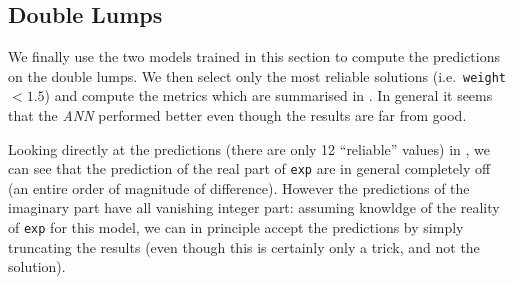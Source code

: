 \subsection{Double Lumps}

We finally use the two models trained in this section to compute the predictions on the double lumps.
We then select only the most reliable solutions (i.e.\ \texttt{weight} $< 1.5$) and compute the metrics which are summarised in .
In general it seems that the \emph{ANN} performed better even though the results are far from good.

\begin{table}[htbp]
  \centering
  \caption{Metrics computed on the double lumps.}
  \label{tab:agg:dlumps}
\end{table}

Looking directly at the predictions (there are only 12 ``reliable'' values) in , we can see that the prediction of the real part of \texttt{exp} are in general completely off (an entire order of magnitude of difference).
However the predictions of the imaginary part have all vanishing integer part: assuming knowldge of the reality of \texttt{exp} for this model, we can in principle accept the predictions by simply truncating the results (even though this is certainly only a trick, and not the solution).\footnotemark{}

